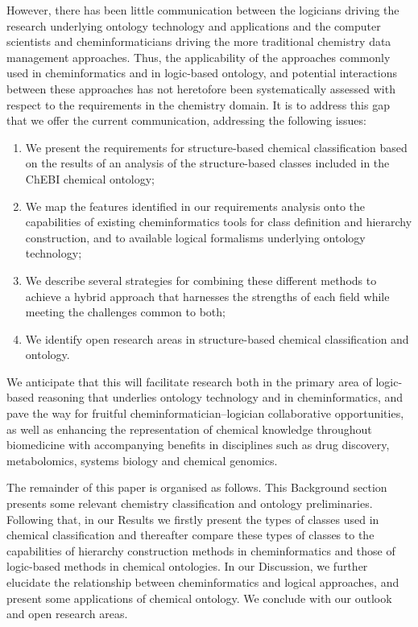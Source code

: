 \documentclass[10pt]{bmc_article}
\newenvironment{bmcformat}{\baselineskip20pt\sloppy\setboolean{publ}{false}}{\baselineskip20pt\sloppy}
\begin{document}
\begin{bmcformat}
However, there has been little communication between the logicians driving the research underlying ontology technology and applications and the computer scientists and cheminformaticians driving the more traditional chemistry data management approaches. Thus, the applicability of the approaches commonly used in cheminformatics and in logic-based ontology, and potential interactions between these approaches has not heretofore been systematically assessed with respect to the requirements in the chemistry domain. It is to address this gap that we offer the current communication, addressing the following issues:
\begin{enumerate}
	\item We present the requirements for structure-based chemical classification based on the results of an analysis of the structure-based classes included in the ChEBI chemical ontology;
	\item We map the features identified in our requirements analysis onto the capabilities of existing cheminformatics tools for class definition and hierarchy construction, and to available logical formalisms underlying ontology technology;
	\item We describe several strategies for combining these different methods to achieve a hybrid approach that harnesses the strengths of each field while meeting the challenges common to both;
	\item We identify open research areas in structure-based chemical classification and ontology.
\end{enumerate}
 
We anticipate that this will facilitate research both in the primary area of logic-based reasoning that underlies ontology technology and in cheminformatics, and pave the way for fruitful cheminformatician--logician collaborative opportunities, as well as enhancing the representation of chemical knowledge throughout biomedicine with accompanying benefits in disciplines such as drug discovery, metabolomics, systems biology and chemical genomics. 

The remainder of this paper is organised as follows. This Background section presents some relevant chemistry classification and ontology preliminaries.  Following that, in our Results we firstly present the types of classes used in chemical classification and thereafter compare these types of classes to the capabilities of hierarchy construction methods in cheminformatics and those of logic-based methods in chemical ontologies. In our Discussion, we further elucidate the relationship between cheminformatics and logical approaches, and present some applications of chemical ontology.  We conclude with our outlook and open research areas. 



\end{bmcformat}
\end{document}
